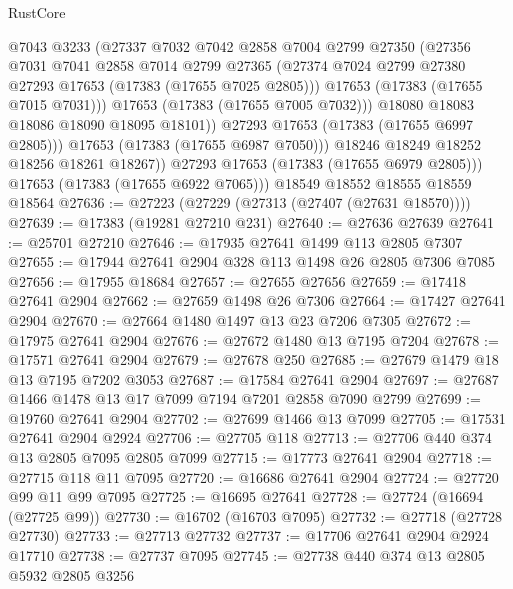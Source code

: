 \begin{lexlean}{RustCore}
\begin{coremodule}
                    @7043
                    @3233
                    (@27337
                      @7032
                      @7042
                      @2858
                      @7004
                      @2799
                      @27350
                      (@27356
                        @7031
                        @7041
                        @2858
                        @7014
                        @2799
                        @27365
                        (@27374 @7024 @2799 @27380 @27293 @17653 (@17383 (@17655 @7025 @2805)))
                        @17653
                        (@17383 (@17655 @7015 @7031)))
                      @17653
                      (@17383 (@17655 @7005 @7032)))
                    @18080
                    @18083
                    @18086
                    @18090
                    @18095
                    @18101))
                @27293
                @17653
                (@17383 (@17655 @6997 @2805)))
              @17653
              (@17383 (@17655 @6987 @7050)))
            @18246
            @18249
            @18252
            @18256
            @18261
            @18267))
        @27293
        @17653
        (@17383 (@17655 @6979 @2805)))
      @17653
      (@17383 (@17655 @6922 @7065)))
    @18549
    @18552
    @18555
    @18559
    @18564
@27636 := @27223 (@27229 (@27313 (@27407 (@27631 @18570))))
@27639 := @17383 (@19281 @27210 @231)
@27640 := @27636 @27639
@27641 := @25701 @27210
@27646 := @17935 @27641 @1499 @113 @2805 @7307
@27655 := @17944 @27641 @2904 @328 @113 @1498 @26 @2805 @7306 @7085
@27656 := @17955 @18684
@27657 := @27655 @27656
@27659 := @17418 @27641 @2904
@27662 := @27659 @1498 @26 @7306
@27664 := @17427 @27641 @2904
@27670 := @27664 @1480 @1497 @13 @23 @7206 @7305
@27672 := @17975 @27641 @2904
@27676 := @27672 @1480 @13 @7195 @7204
@27678 := @17571 @27641 @2904
@27679 := @27678 @250
@27685 := @27679 @1479 @18 @13 @7195 @7202 @3053
@27687 := @17584 @27641 @2904
@27697 := @27687 @1466 @1478 @13 @17 @7099 @7194 @7201 @2858 @7090 @2799
@27699 := @19760 @27641 @2904
@27702 := @27699 @1466 @13 @7099
@27705 := @17531 @27641 @2904 @2924
@27706 := @27705 @118
@27713 := @27706 @440 @374 @13 @2805 @7095 @2805 @7099
@27715 := @17773 @27641 @2904
@27718 := @27715 @118 @11 @7095
@27720 := @16686 @27641 @2904
@27724 := @27720 @99 @11 @99 @7095
@27725 := @16695 @27641
@27728 := @27724 (@16694 (@27725 @99))
@27730 := @16702 (@16703 @7095)
@27732 := @27718 (@27728 @27730)
@27733 := @27713 @27732
@27737 := @17706 @27641 @2904 @2924 @17710
@27738 := @27737 @7095
@27745 := @27738 @440 @374 @13 @2805 @5932 @2805 @3256

\end{coremodule}
\end{lexlean}
